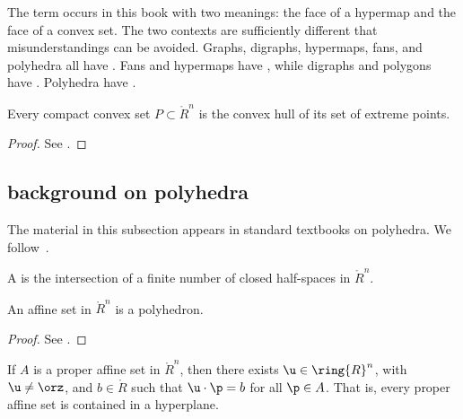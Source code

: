 \begin{remark}[polysemes]\label{remark:face} 
The term  occurs in this book with two meanings: the
face of a hypermap and the face of a convex set.  The two contexts
are sufficiently different that  misunderstandings can be avoided.
Graphs, digraphs, hypermaps, fans, and polyhedra all have .
Fans and hypermaps have , while digraphs and polygons 
have .  Polyhedra have .
\end{remark}

\begin{lemma} Every compact
convex set $P\subset\ring{R}^n$ is the convex hull of its set of
extreme points.
\end{lemma}

\begin{proof}  See \cite[Theorem~2.6.16]{webster:1994}.
\end{proof}

\subsection{background on polyhedra}


The material in this subsection appears in standard textbooks on polyhedra.
We follow~\cite{webster:1994}.

\begin{definition}[polyhedron]
A  is the
intersection of a finite number of closed half-spaces in
$\ring{R}^n$.  
\end{definition}
%

\begin{lemma}[]\label{lemma:aff-poly}
An affine set in $\ring{R}^n$ is a polyhedron.
\end{lemma}

\begin{proof} See \cite[Cor~1.4.2]{webster:1994}.
\end{proof}

\begin{lemma}[]\label{lemma:aff-u}
If $A$ is a proper affine set in $\ring{R}^n$, then there exists $\u\in \ring{R}^n$, with
$\u\ne\orz$, and $b\in\ring{R}$ 
such that $\u\cdot\p = b$ for all $\p\in A$.  That is, every proper affine set
is contained in a hyperplane.
\end{lemma}

